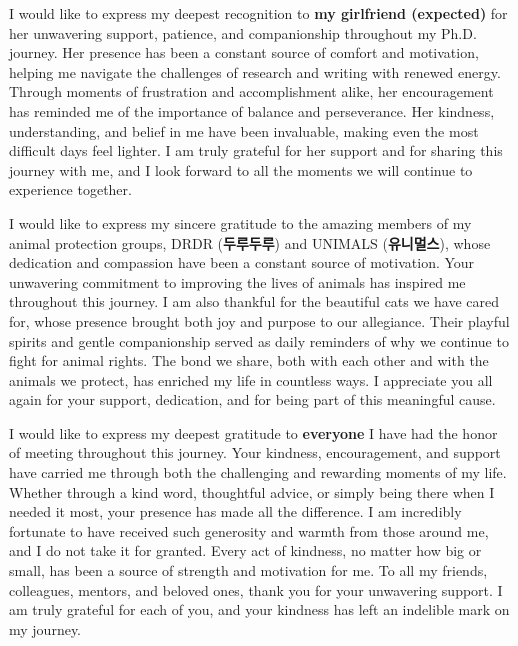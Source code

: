 \documentclass[11pt, a4paper, onecolumn, oneside]{report}
\begin{document}
        I would like to express my deepest recognition to \textbf{my girlfriend (expected)} for her unwavering support, patience, and companionship throughout my Ph.D. journey. Her presence has been a constant source of comfort and motivation, helping me navigate the challenges of research and writing with renewed energy. Through moments of frustration and accomplishment alike, her encouragement has reminded me of the importance of balance and perseverance. Her kindness, understanding, and belief in me have been invaluable, making even the most difficult days feel lighter. I am truly grateful for her support and for sharing this journey with me, and I look forward to all the moments we will continue to experience together.

        I would like to express my sincere gratitude to the amazing members of my animal protection groups, DRDR (\textbf{두루두루}) and UNIMALS (\textbf{유니멀스}), whose dedication and compassion have been a constant source of motivation. Your unwavering commitment to improving the lives of animals has inspired me throughout this journey. I am also thankful for the beautiful cats we have cared for, whose presence brought both joy and purpose to our allegiance. Their playful spirits and gentle companionship served as daily reminders of why we continue to fight for animal rights. The bond we share, both with each other and with the animals we protect, has enriched my life in countless ways. I appreciate you all again for your support, dedication, and for being part of this meaningful cause.

        I would like to express my deepest gratitude to \textbf{everyone} I have had the honor of meeting throughout this journey. Your kindness, encouragement, and support have carried me through both the challenging and rewarding moments of my life. Whether through a kind word, thoughtful advice, or simply being there when I needed it most, your presence has made all the difference. I am incredibly fortunate to have received such generosity and warmth from those around me, and I do not take it for granted. Every act of kindness, no matter how big or small, has been a source of strength and motivation for me. To all my friends, colleagues, mentors, and beloved ones, thank you for your unwavering support. I am truly grateful for each of you, and your kindness has left an indelible mark on my journey.
\end{document}
